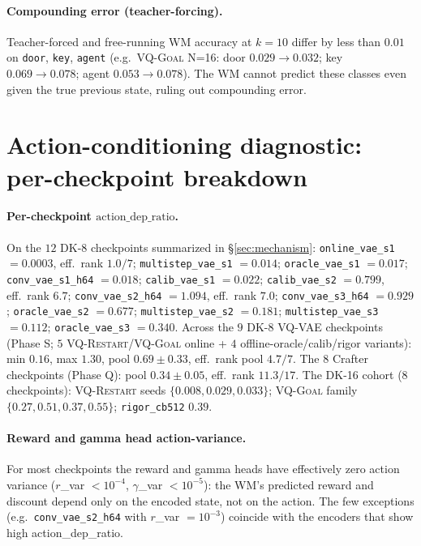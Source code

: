 \documentclass{article}
\newcommand{\encVQRestart}{\textsc{VQ-Restart}}
\newcommand{\encVQGoal}{\textsc{VQ-Goal}}
\begin{document}
\paragraph{Compounding error (teacher-forcing).} Teacher-forced and free-running WM accuracy at $k{=}10$ differ by less than $0.01$ on \texttt{door}, \texttt{key}, \texttt{agent} (e.g.\ \encVQGoal{} N=16: door $0.029 \to 0.032$; key $0.069 \to 0.078$; agent $0.053 \to 0.078$). The WM cannot predict these classes even given the true previous state, ruling out compounding error.

\section{Action-conditioning diagnostic: per-checkpoint breakdown}\label{app:phaseN}

\paragraph{Per-checkpoint $\mathrm{action\_dep\_ratio}$.} On the $12$ DK-8 checkpoints summarized in \S\ref{sec:mechanism}: \texttt{online\_vae\_s1} $=0.0003$, eff.\ rank $1.0/7$; \texttt{multistep\_vae\_s1} $=0.014$; \texttt{oracle\_vae\_s1} $=0.017$; \texttt{conv\_vae\_s1\_h64} $=0.018$; \texttt{calib\_vae\_s1} $=0.022$; \texttt{calib\_vae\_s2} $=0.799$, eff.\ rank $6.7$; \texttt{conv\_vae\_s2\_h64} $=1.094$, eff.\ rank $7.0$; \texttt{conv\_vae\_s3\_h64} $=0.929$; \texttt{oracle\_vae\_s2} $=0.677$; \texttt{multistep\_vae\_s2} $=0.181$; \texttt{multistep\_vae\_s3} $=0.112$; \texttt{oracle\_vae\_s3} $=0.340$. Across the $9$ DK-8 VQ-VAE checkpoints (Phase S; $5$ \encVQRestart{}/\encVQGoal{} online + $4$ offline-oracle/calib/rigor variants): min $0.16$, max $1.30$, pool $0.69 \pm 0.33$, eff.\ rank pool $4.7/7$. The $8$ Crafter checkpoints (Phase Q): pool $0.34 \pm 0.05$, eff.\ rank $11.3/17$. The DK-16 cohort ($8$ checkpoints): \encVQRestart{} seeds $\{0.008, 0.029, 0.033\}$; \encVQGoal{} family $\{0.27, 0.51, 0.37, 0.55\}$; \texttt{rigor\_cb512} $0.39$.

\paragraph{Reward and gamma head action-variance.} For most checkpoints the reward and gamma heads have effectively zero action variance ($r$\_var $< 10^{-4}$, $\gamma$\_var $< 10^{-5}$): the WM's predicted reward and discount depend only on the encoded state, not on the action. The few exceptions (e.g.\ \texttt{conv\_vae\_s2\_h64} with $r$\_var $=10^{-3}$) coincide with the encoders that show high action\_dep\_ratio.
\end{document}
